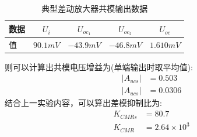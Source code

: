 \documentclass[a4paper,11pt,UTF8]{ctexart}
\begin{document}
\begin{table}[!h!tbp]
  \caption{典型差动放大器共模输出数据}\label{tab:ncTab}
    \centering
    \begin{tabular}{|l|c|c|c|c|}
    \hline
    数据 &$U_{i}$&$U_{oc_1}$&$U_{oc_2}$&$U_{oc}$         \\ \hline
    值   &$90.1mV$&$-43.9mV$&$-46.8mV$&$1.610mV$     \\ \hline
  \end{tabular}
  \end{table}
则可以计算出共模电压增益为(单端输出时取平均值):
\begin{equation}
  \begin{aligned}
    \left | A_{ucs}\right |&=0.503\\
    \left | A_{ucs}\right |&=0.0306
  \end{aligned}
\end{equation}
结合上一实验内容，可以算出差模抑制比为:
\begin{equation}
  \begin{aligned}
    K_{CMRs}&=80.7\\
    K_{CMR}&=2.64\times10^{3}
  \end{aligned}
\end{equation}
\end{document}
